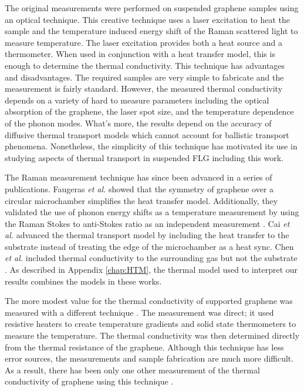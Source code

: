 The original measurements were performed on suspended graphene samples using an optical technique.
This creative technique uses a laser excitation to heat the sample and the temperature induced energy shift of the Raman scattered light to measure temperature.
The laser excitation provides both a heat source and a thermometer.
When used in conjunction with a heat transfer model, this is enough to determine the thermal conductivity.
This technique has advantages and disadvantages.
The required samples are very simple to fabricate and the measurement is fairly standard.
However, the measured thermal conductivity depends on a variety of hard to measure parameters including the optical absorption of the graphene, the laser spot size, and the temperature dependence of the phonon modes.
What's more, the results depend on the accuracy of diffusive thermal transport models which cannot account for ballistic transport phenomena.
Nonetheless, the simplicity of this technique has motivated its use in studying aspects of thermal transport in suspended FLG \cite{Balandin2008,Faugeras2010,Cai2010,Ghosh2010,Lee2011,Chen2011a,Chen2012} including this work.

The Raman measurement technique has since been advanced in a series of publications.
Faugeras \textit{et al.} showed that the symmetry of graphene over a circular microchamber simplifies the heat transfer model.
Additionally, they validated the use of phonon energy shifts as a temperature measurement by using the Raman Stokes to anti-Stokes ratio as an independent measurement \cite{Faugeras2010}.
Cai \textit{et al.} advanced the thermal transport model by including the heat transfer to the substrate instead of treating the edge of the microchamber as a heat sync.
Chen \textit{et al.} included thermal conductivity to the surrounding gas but not the substrate \cite{Chen2011a}.
As described in Appendix \ref{chap:HTM}, the thermal model used to interpret our results combines the models in these works.

The more modest value for the thermal conductivity of supported graphene was measured with a different technique \cite{Seol2010}.
The measurement was direct; it used resistive heaters to create temperature gradients and solid state thermometers to measure the temperature.
The thermal conductivity was then determined directly from the thermal resistance of the graphene.
Although this technique has less error sources, the measurements and sample fabrication are much more difficult.
As a result, there has been only one other measurement of the thermal conductivity of graphene using this technique \cite{Jang2010}.

